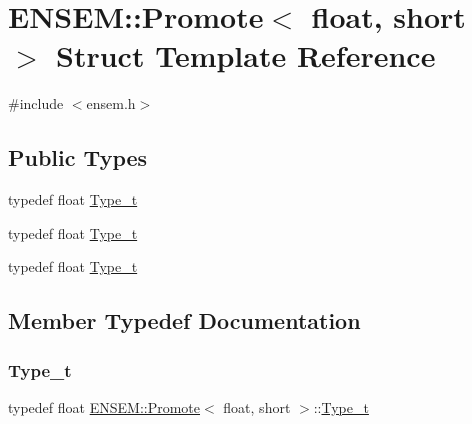 \hypertarget{structENSEM_1_1Promote_3_01float_00_01short_01_4}{}\section{E\+N\+S\+EM\+:\+:Promote$<$ float, short $>$ Struct Template Reference}
\label{structENSEM_1_1Promote_3_01float_00_01short_01_4}


{\ttfamily \#include $<$ensem.\+h$>$}

\subsection*{Public Types}
\begin{DoxyCompactItemize}
\item 
typedef float \mbox{\hyperlink{structENSEM_1_1Promote_3_01float_00_01short_01_4_a353d7eb6960736f72669b0ec69c11319}{Type\+\_\+t}}
\item 
typedef float \mbox{\hyperlink{structENSEM_1_1Promote_3_01float_00_01short_01_4_a353d7eb6960736f72669b0ec69c11319}{Type\+\_\+t}}
\item 
typedef float \mbox{\hyperlink{structENSEM_1_1Promote_3_01float_00_01short_01_4_a353d7eb6960736f72669b0ec69c11319}{Type\+\_\+t}}
\end{DoxyCompactItemize}


\subsection{Member Typedef Documentation}
\mbox{\label{structENSEM_1_1Promote_3_01float_00_01short_01_4_a353d7eb6960736f72669b0ec69c11319}} 
\subsubsection{\texorpdfstring{Type\_t}{Type\_t}\hspace{0.1cm}{\footnotesize\ttfamily [1/3]}}
{\footnotesize\ttfamily typedef float \mbox{\hyperlink{structENSEM_1_1Promote}{E\+N\+S\+E\+M\+::\+Promote}}$<$ float, short $>$\+::\mbox{\hyperlink{structENSEM_1_1Promote_3_01float_00_01short_01_4_a353d7eb6960736f72669b0ec69c11319}{Type\+\_\+t}}}

